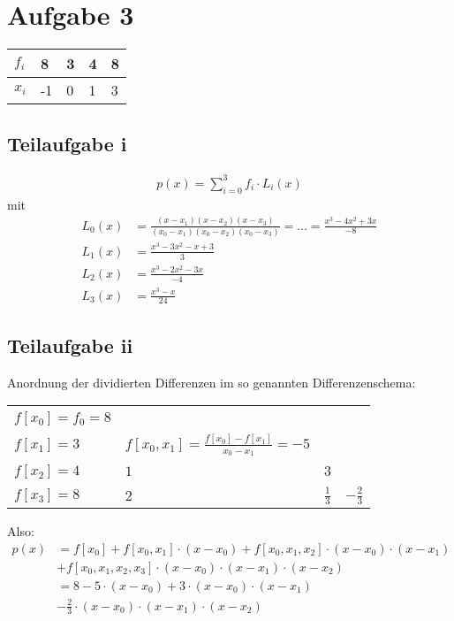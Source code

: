 \section*{Aufgabe 3}

\begin{table}[H]
    \begin{tabular}{l|l|l|l|l}
    $f_i$ & 8 & 3 & 4 & 8 \\ \hline
    $x_i$ & -1 & 0 & 1 & 3 \\
    \end{tabular}
\end{table}

\subsection*{Teilaufgabe i}
\begin{align}
	p(x) = \sum_{i=0}^3 f_i \cdot L_i(x)
\end{align}
mit
\begin{align}
	L_0(x) &= \frac{(x-x_1)(x-x_2)(x-x_3)}{(x_0 - x_1)(x_0-x_2)(x_0-x_3)}
	= \ldots = \frac{x^3 - 4x^2 + 3x}{-8} \\
	L_1(x) &= \frac{x^3 - 3x^2 - x + 3}{3} \\
	L_2(x) &= \frac{x^3 - 2x^2 - 3x}{-4} \\
	L_3(x) &= \frac{x^3 - x}{24}
\end{align}

\subsection*{Teilaufgabe ii}
Anordnung der dividierten Differenzen im so genannten Differenzenschema:
\begin{table}[H]
    \begin{tabular}{llll}
    $f[x_0]=f_0=8$ & ~                                                   & ~             & ~                \\
    $f[x_1]= 3$    & $f[x_0,x_1] = \frac{f[x_0] - f[x_1]}{x_0-x_1} = -5$ & ~             & ~                \\
    $f[x_2] = 4$   & $1$                                                 & $3$           & ~                \\
    $f[x_3] = 8$   & $2$                                                 & $\frac{1}{3}$ & $- \frac{2}{3} $ \\
    \end{tabular}
\end{table}
Also:
\begin{align}
	p(x) &= f[x_0] + f[x_0,x_1] \cdot (x-x_0) + f[x_0, x_1, x_2] \cdot (x-x_0) \cdot (x-x_1) \\ & + f[x_0, x_1, x_2, x_3] \cdot (x-x_0) \cdot (x-x_1) \cdot (x-x_2) \\
	&= 8 - 5 \cdot (x-x_0) + 3 \cdot (x-x_0) \cdot (x-x_1) \\ & - \frac{2}{3} \cdot (x-x_0) \cdot (x-x_1) \cdot (x-x_2)
\end{align}
